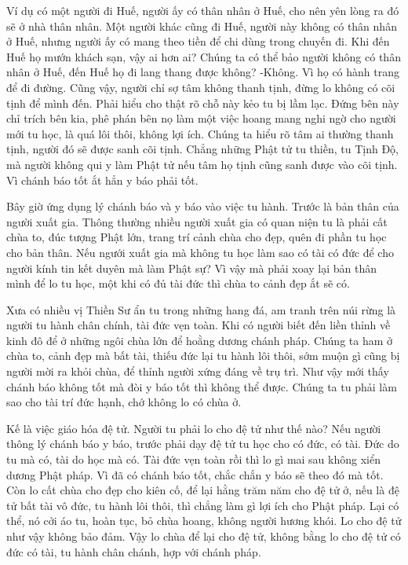 \documentclass[
  12pt,
  oneside]{book}
\begin{document}
Ví dụ có một người đi Huế, người ấy có thân nhân ở Huế, cho nên yên lòng ra đó sẽ ở nhà thân nhân. Một người khác cũng đi Huế, người này không có thân nhân ở Huế, nhưng người ấy có mang theo tiền để chi dùng trong chuyến đi. Khi đến Huế họ mướn khách sạn, vậy ai hơn ai? Chúng ta có thể bảo người không có thân nhân ở Huế, đến Huế họ đi lang thang được không? -Không. Vì họ có hành trang để đi đường. Cũng vậy, người chỉ sợ tâm không thanh tịnh, đừng lo không có cõi tịnh để mình đến. Phải hiểu cho thật rõ chỗ này kẻo tu bị lầm lạc. Đứng bên này chỉ trích bên kia, phê phán bên nọ làm một việc hoang mang nghi ngờ cho người mới tu học, là quá lôi thôi, không lợi ích. Chúng ta hiểu rõ tâm ai thường thanh tịnh, người đó sẽ được sanh cõi tịnh. Chẳng những Phật tử tu thiền, tu Tịnh Độ, mà người không qui y làm Phật tử nếu tâm họ tịnh cũng sanh được vào cõi tịnh. Vì chánh báo tốt ắt hẳn y báo phải tốt.

Bây giờ ứng dụng lý chánh báo và y báo vào việc tu hành. Trước là bản thân của người xuất gia. Thông thường nhiều người xuất gia có quan niện tu là phải cất chùa to, đúc tượng Phật lớn, trang trí cảnh chùa cho đẹp, quên đi phần tu học cho bản thân. Nếu ngưới xuất gia mà không tu học làm sao có tài có đức để cho người kính tin kết duyên mà làm Phật sự? Vì vậy mà phải xoay lại bản thân mình để lo tu học, một khi có đủ tài đức thì chùa to cảnh đẹp ắt sẽ có.

Xưa có nhiều vị Thiền Sư ẩn tu trong những hang đá, am tranh trên núi rừng là người tu hành chân chính, tài đức vẹn toàn. Khi có người biết đến liền thỉnh về kinh đô để ở những ngôi chùa lớn để hoằng dương chánh pháp. Chúng ta ham ở chùa to, cảnh đẹp mà bất tài, thiếu đức lại tu hành lôi thôi, sớm muộn gì cũng bị người mời ra khỏi chùa, để thỉnh người xứng đáng về trụ trì. Như vậy mới thấy chánh báo không tốt mà đòi y báo tốt thì không thể được. Chúng ta tu phải làm sao cho tài trí đức hạnh, chớ không lo có chùa ở.

Kế là việc giáo hóa đệ tử. Người tu phải lo cho đệ tử như thế nào? Nếu người thông lý chánh báo y báo, trước phải dạy đệ tử tu học cho có đức, có tài. Đức do tu mà có, tài do học mà có. Tài đức vẹn toàn rồi thì lo gì mai sau không xiển dương Phật pháp. Vì đã có chánh báo tốt, chắc chắn y báo sẽ theo đó mà tốt. Còn lo cất chùa cho đẹp cho kiên cố, để lại hằng trăm năm cho đệ tử ở, nếu là đệ tử bất tài vô đức, tu hành lôi thôi, thì chẳng làm gì lợi ích cho Phật pháp. Lại có thể, nó cởi áo tu, hoàn tục, bỏ chùa hoang, không người hương khói. Lo cho đệ tử như vậy không bảo đảm. Vậy lo chùa để lại cho đệ tử, không bằng lo cho đệ tử có đức có tài, tu hành chân chánh, hợp với chánh pháp.
\end{document}

